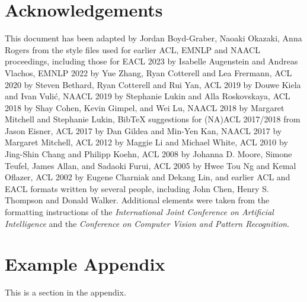 \documentclass[11pt]{article}
\begin{document}
\section*{Acknowledgements}
This document has been adapted by Jordan Boyd-Graber, Naoaki Okazaki, Anna Rogers from the style files used for earlier ACL, EMNLP and NAACL proceedings, including those for
EACL 2023 by Isabelle Augenstein and Andreas Vlachos,
EMNLP 2022 by Yue Zhang, Ryan Cotterell and Lea Frermann,
ACL 2020 by Steven Bethard, Ryan Cotterell and Rui Yan,
ACL 2019 by Douwe Kiela and Ivan Vuli\'{c},
NAACL 2019 by Stephanie Lukin and Alla Roskovskaya, 
ACL 2018 by Shay Cohen, Kevin Gimpel, and Wei Lu, 
NAACL 2018 by Margaret Mitchell and Stephanie Lukin,
Bib\TeX{} suggestions for (NA)ACL 2017/2018 from Jason Eisner,
ACL 2017 by Dan Gildea and Min-Yen Kan, NAACL 2017 by Margaret Mitchell, 
ACL 2012 by Maggie Li and Michael White, 
ACL 2010 by Jing-Shin Chang and Philipp Koehn, 
ACL 2008 by Johanna D. Moore, Simone Teufel, James Allan, and Sadaoki Furui, 
ACL 2005 by Hwee Tou Ng and Kemal Oflazer, 
ACL 2002 by Eugene Charniak and Dekang Lin, 
and earlier ACL and EACL formats written by several people, including
John Chen, Henry S. Thompson and Donald Walker.
Additional elements were taken from the formatting instructions of the \emph{International Joint Conference on Artificial Intelligence} and the \emph{Conference on Computer Vision and Pattern Recognition}.




\appendix

\section{Example Appendix}
\label{sec:appendix}

This is a section in the appendix.
\end{document}
